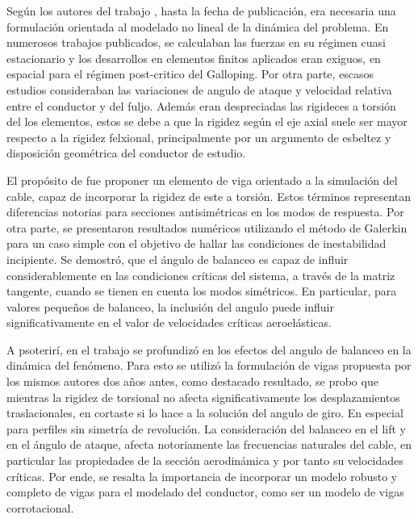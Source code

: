 Según los autores del trabajo \cite{luongo2007linear}, hasta la fecha de publicación, era necesaria una formulación orientada al modelado no lineal de la dinámica del problema. En numerosos trabajos publicados, se calculaban las fuerzas en su régimen cuasi estacionario y los desarrollos en elementos finitos aplicados eran exiguos, en espacial para el régimen post-critico del Galloping. Por otra parte, escasos estudios consideraban las variaciones de angulo de ataque y velocidad relativa entre el conductor y del fuljo. Además eran despreciadas las rigideces a torsión del los elementos, estos se debe a que la rigidez según el eje axial suele ser mayor respecto a la rigidez felxional, principalmente por un argumento de esbeltez y disposición geométrica del conductor de estudio.  

El propósito de \cite{luongo2007linear} fue proponer un elemento de viga orientado a la simulación del cable, capaz de incorporar la rigidez de este a torsión. Estos términos representan diferencias notorias para secciones antisimétricas en los modos de respuesta. Por otra parte, se presentaron resultados numéricos utilizando el método de Galerkin para un caso simple con el objetivo de hallar las condiciones de inestabilidad incipiente. Se demostró, que el ángulo de balanceo es capaz de influir considerablemente en las condiciones críticas del sistema, a través de la matriz tangente, cuando se tienen en cuenta los modos simétricos. En particular, para valores pequeños de balanceo, la inclusión del angulo puede influir significativamente en el valor de velocidades críticas aeroelásticas.

 A psoterirí, en el trabajo \cite{luongo2009effect} se profundizó en los efectos del angulo de balanceo en la dinámica del fenómeno. Para esto se utilizó la formulación de vigas propuesta por los mismos autores dos años antes, como destacado resultado, se probo que mientras la rigidez de torsional no afecta significativamente los desplazamientos traslacionales, en cortaste si lo hace a la solución del angulo de giro. En especial para perfiles sin simetría de revolución. La consideración del balanceo en el lift y en el ángulo de ataque, afecta notoriamente las frecuencias naturales del cable, en particular las propiedades de la sección aerodinámica y por tanto su velocidades críticas. Por ende, se resalta la importancia de incorporar un modelo robusto y completo de vigas para el modelado del conductor, como ser un modelo de vigas corrotacional.



